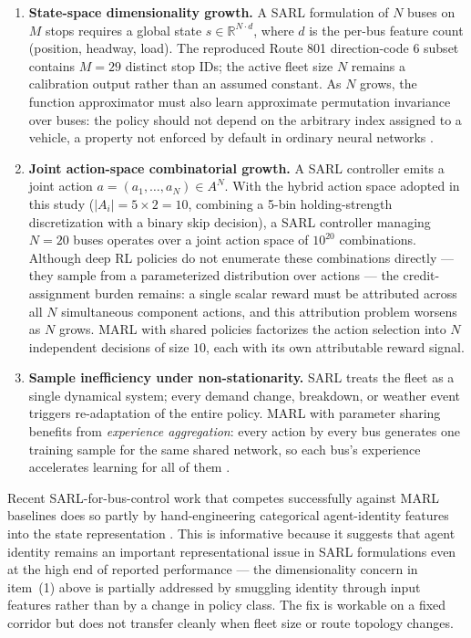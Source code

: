 \begin{enumerate}
\item \textbf{State-space dimensionality growth.} A SARL formulation of $N$ buses on $M$ stops requires a global state $s \in \mathbb{R}^{N \cdot d}$, where $d$ is the per-bus feature count (position, headway, load). The reproduced Route 801 direction-code 6 subset contains $M=29$ distinct stop IDs; the active fleet size $N$ remains a calibration output rather than an assumed constant. As $N$ grows, the function approximator must also learn approximate permutation invariance over buses: the policy should not depend on the arbitrary index assigned to a vehicle, a property not enforced by default in ordinary neural networks \cite{Wang2023MultiObj}.

\item \textbf{Joint action-space combinatorial growth.} A SARL controller emits a joint action $a = (a_1, \ldots, a_N) \in A^N$. With the hybrid action space adopted in this study ($|A_i| = 5 \times 2 = 10$, combining a 5-bin holding-strength discretization with a binary skip decision), a SARL controller managing $N = 20$ buses operates over a joint action space of $10^{20}$ combinations. Although deep RL policies do not enumerate these combinations directly --- they sample from a parameterized distribution over actions --- the credit-assignment burden remains: a single scalar reward must be attributed across all $N$ simultaneous component actions, and this attribution problem worsens as $N$ grows. MARL with shared policies factorizes the action selection into $N$ independent decisions of size $10$, each with its own attributable reward signal.

\item \textbf{Sample inefficiency under non-stationarity.} SARL treats the fleet as a single dynamical system; every demand change, breakdown, or weather event triggers re-adaptation of the entire policy. MARL with parameter sharing benefits from \textit{experience aggregation}: every action by every bus generates one training sample for the same shared network, so each bus's experience accelerates learning for all of them \cite{Christianos2021PS,Yu2022MAPPO}.
\end{enumerate}

Recent SARL-for-bus-control work that competes successfully against MARL baselines does so partly by hand-engineering categorical agent-identity features into the state representation \cite{Zhang2025SADRL}. This is informative because it suggests that agent identity remains an important representational issue in SARL formulations even at the high end of reported performance --- the dimensionality concern in item~(1) above is partially addressed by smuggling identity through input features rather than by a change in policy class. The fix is workable on a fixed corridor but does not transfer cleanly when fleet size or route topology changes.

